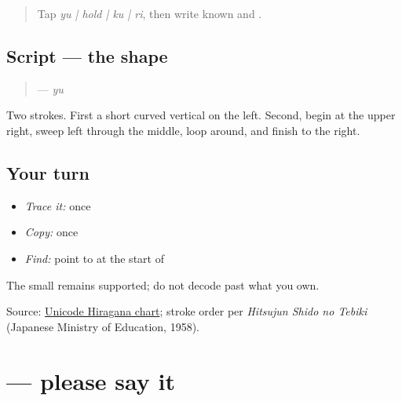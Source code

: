 \label{lesson:JA-W10-yu}



\begin{quote}
Tap \emph{yu | hold | ku | ri}, then write known \textbf{} and \textbf{}.
\end{quote}

\subsection*{Script — the shape}

\begin{quote}
\textbf{} — \emph{yu}
\end{quote}

Two strokes. First a short curved vertical on the left. Second, begin at the upper right, sweep left through the middle, loop around, and finish to the right.

\subsection*{Your turn}
\begin{itemize}
\raggedright
  \item \emph{Trace it:} \textbf{} once
  \item \emph{Copy:} \textbf{} once
  \item \emph{Find:} point to \textbf{} at the start of \textbf{}
\end{itemize}

\begin{tcolorbox}[breakable,colback=teal!4,colframe=teal!35!black,title={Before you move on}]
The small \textbf{} remains supported; do not decode past what you own.

Source: \href{https://www.unicode.org/charts/PDF/U3040.pdf}{Unicode Hiragana chart}; stroke order per \emph{Hitsujun Shido no Tebiki} (Japanese Ministry of Education, 1958).
\end{tcolorbox}
\section[\texorpdfstring{\ja{いってください} (itte kudasai)}{いってください (itte kudasai)}]{ — please say it}

\label{lesson:JA-C10-itte-kudasai}



